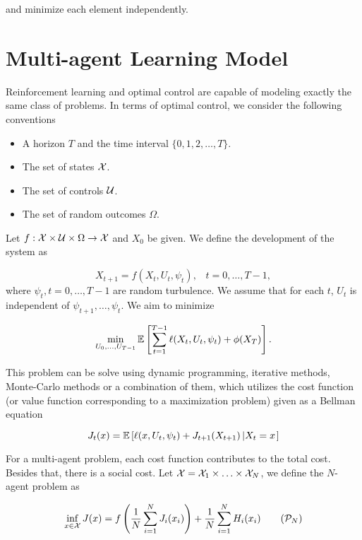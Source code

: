 and minimize each element independently.

\section{Multi-agent Learning Model}
Reinforcement learning and optimal control are capable of modeling exactly the same class of problems. In terms of optimal control, we consider the following conventions

\begin{itemize}
    \item A horizon $T$ and the time interval $\{0,1,2,\ldots, T\}$.
    \item The set of states $\mathcal{X}$.
    \item The set of controls $\mathcal{U}$.
    \item The set of random outcomes $\Omega$.
\end{itemize}

Let $f:\mathcal{X}\times\mathcal{U}\times\Omega\to\mathcal{X}$ and $X_0$ be given. We define the development of the system as

\begin{equation}
    X_{t+1} = f(X_t, U_t, \psi_t), \,\,\,\,\, t = 0,\ldots, T-1,
\end{equation}
where $\psi_t, t = 0,\ldots, T-1$ are random turbulence. We assume that for each $t$, $U_t$ is independent of $\psi_{t+1},\ldots, \psi_t$. We aim to minimize

\begin{equation}
    \min\limits_{U_0,\ldots, U_{T-1}} \mathbb{E}\left[\sum\limits_{t=1}^{T-1}\ell(X_t,U_t,\psi_t) + \phi(X_T)\right].
\end{equation}

This problem can be solve using dynamic programming, iterative methods, Monte-Carlo methods or a combination of them, which utilizes the cost function (or value function corresponding to a maximization problem) given as a Bellman equation

\begin{equation}
    J_t(x) = \mathbb{E}\left[\ell(x, U_t,\psi_t) + J_{t+1}(X_{t+1})\left|X_t = x\right.\right]
\end{equation}


For a multi-agent problem, each cost function contributes to the total cost. Besides that, there is a social cost. Let $\mathcal{X} = \mathcal{X}_1\times\ldots\times\mathcal{X}_N$, we define the $N$-agent problem as

\begin{equation}
    \inf\limits_{x\in\X} J(x) = f\left(\dfrac{1}{N}\sum\limits_{i=1}^N J_i(x_i)\right) + \dfrac{1}{N}\sum\limits_{i=1}^N H_i(x_i) \tag{$\mathcal{P}_N$}
\end{equation}

